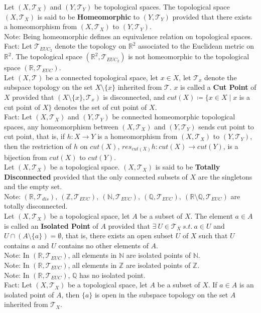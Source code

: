 \documentclass[11pt]{article}
\newcommand{\R}{\mathbb{R}}
\newcommand{\N}{\mathbb{N}}
\newcommand{\Z}{\mathbb{Z}}
\newcommand{\Q}{\mathbb{Q}}
\newcommand{\T}{\mathcal{T}}
\newcommand{\note}{\color{gray}Note: \color{black}}
\newcommand{\fact}{\color{gray}Fact: \color{black}}
\begin{document}
		\noindent Let $(X,\T_X)$ and $(Y,\T_Y)$ be topological spaces. The topological space $(X,\T_X)$ is said to be \textbf{Homeomorphic} to $(Y,\T_Y)$ provided that there exists a homeomorphism from $(X,\T_X)$ to $(Y,\T_Y)$.\\
		\note Being homeomorphic defines an equivalence relation on topological spaces.\\
		\fact Let $\T_{EUC_2}$ denote the topology on $\R^2$ associated to the Euclidean metric on $\R^2$. The topological space $(\R^2, \T_{EUC_2})$ is not homeomorphic to the topological space $(\R, \T_{EUC})$.\\	
 	
		
		\noindent Let $(X,\T)$ be a connected topological space, let $x \in X$, let $\T_{x}$ denote the subspace topology on the set $X \setminus \{x\}$ inherited from $\T$. $x$ is called a \textbf{Cut Point} of $X$ provided that $(X \setminus \{x\}, \T_x)$ is disconnected, and $cut(X) \coloneqq \{ x \in X \mid x$ is a cut point of $X \} $ denotes the set of cut point of $X$.\\
		\fact Let $(X,\T_X)$ and $(Y,\T_Y)$ be connected homeomorphic topological spaces, any homeomorphism between $(X,\T_X)$ and $(Y,\T_Y)$ sends cut point to cut point, that is, if $h:X \to Y$ is a homeomorphism from $(X,\T_X)$ to $(Y,\T_Y)$, then the restriction of $h$ on $cut(X)$, $res_{cut(X)}h:cut(X) \to cut(Y)$, is a bijection from $cut(X)$ to $cut(Y)$.\\
		
		\noindent Let $(X,\T_X)$ be a topological space. $(X,\T_X)$ is said to be \textbf{Totally Disconnected} provided that the only connected subsets of $X$ are the singletons and the empty set.\\
		\note $(\R,\T_{dis}),\ (\Z,\T_{EUC}),\ (\N,\T_{EUC}),\ (\Q,\T_{EUC}),\ (\R \setminus \Q,\T_{EUC})$ are totally disconnected.\\
		
		\noindent Let $(X,\T_X)$ be a topological space, let $A$ be a subset of $X$. The element $a \in A$ is called an \textbf{Isolated Point} of $A$ provided that $\exists \ U \in \T_X \ s.t. \ a \in U$ and $U \cap (A \setminus \{a\})= \emptyset$, that is, there exists an open subset $U$ of $X$ such that $U$ contains $a$ and $U$ contains no other elements of $A$.\\ 
		\note In $(\R,\T_{EUC})$, all elements in $\N$ are isolated points of $\N$.\\
		\note In $(\R,\T_{EUC})$, all elements in $\Z$ are isolated points of $\Z$.\\
		\note In $(\R,\T_{EUC})$, $\Q$ has no isolated point.\\
		\fact Let $(X,\T_X)$ be a topological space, let $A$ be a subset of $X$. If $a \in A$ is an isolated point of $A$, then $\{a\}$ is open in the subspace topology on the set $A$ inherited from $\T_X$.\\	
\end{document}
